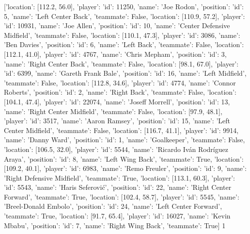 [{'location': [112.2, 56.0], 'player': {'id': 11250, 'name': 'Joe Rodon'}, 'position': {'id': 5, 'name': 'Left Center Back'}, 'teammate': False}, {'location': [110.9, 57.2], 'player': {'id': 10931, 'name': 'Joe Allen'}, 'position': {'id': 10, 'name': 'Center Defensive Midfield'}, 'teammate': False}, {'location': [110.1, 47.3], 'player': {'id': 3086, 'name': 'Ben Davies'}, 'position': {'id': 6, 'name': 'Left Back'}, 'teammate': False}, {'location': [112.1, 41.0], 'player': {'id': 4767, 'name': 'Chris Mepham'}, 'position': {'id': 3, 'name': 'Right Center Back'}, 'teammate': False}, {'location': [98.1, 67.0], 'player': {'id': 6399, 'name': 'Gareth Frank Bale'}, 'position': {'id': 16, 'name': 'Left Midfield'}, 'teammate': False}, {'location': [112.8, 34.6], 'player': {'id': 4774, 'name': 'Connor Roberts'}, 'position': {'id': 2, 'name': 'Right Back'}, 'teammate': False}, {'location': [104.1, 47.4], 'player': {'id': 22074, 'name': 'Joseff Morrell'}, 'position': {'id': 13, 'name': 'Right Center Midfield'}, 'teammate': False}, {'location': [97.9, 48.1], 'player': {'id': 3517, 'name': 'Aaron Ramsey'}, 'position': {'id': 15, 'name': 'Left Center Midfield'}, 'teammate': False}, {'location': [116.7, 41.1], 'player': {'id': 9914, 'name': 'Danny Ward'}, 'position': {'id': 1, 'name': 'Goalkeeper'}, 'teammate': False}, {'location': [106.5, 32.0], 'player': {'id': 5544, 'name': 'Ricardo Iván Rodríguez Araya'}, 'position': {'id': 8, 'name': 'Left Wing Back'}, 'teammate': True}, {'location': [109.2, 40.1], 'player': {'id': 6983, 'name': 'Remo Freuler'}, 'position': {'id': 9, 'name': 'Right Defensive Midfield'}, 'teammate': True}, {'location': [113.1, 60.3], 'player': {'id': 5543, 'name': 'Haris Seferović'}, 'position': {'id': 22, 'name': 'Right Center Forward'}, 'teammate': True}, {'location': [102.4, 58.7], 'player': {'id': 5545, 'name': 'Breel-Donald Embolo'}, 'position': {'id': 24, 'name': 'Left Center Forward'}, 'teammate': True}, {'location': [91.7, 65.4], 'player': {'id': 16027, 'name': 'Kevin Mbabu'}, 'position': {'id': 7, 'name': 'Right Wing Back'}, 'teammate': True}]                                                                                                                                                                                                                                                                                                                                                                                                                                                                                                                                                                                                                                                                                                                                                                                                                                                       1
